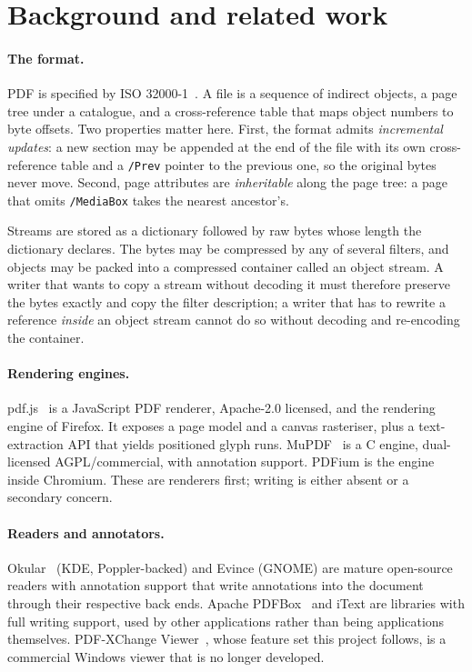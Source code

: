 \section{Background and related work}
\label{sec:related}

\paragraph{The format.} PDF is specified by ISO 32000-1~\cite{iso32000}. A file is a
sequence of indirect objects, a page tree under a catalogue, and a cross-reference table
that maps object numbers to byte offsets. Two properties matter here. First, the format
admits \emph{incremental updates}: a new section may be appended at the end of the file with
its own cross-reference table and a \texttt{/Prev} pointer to the previous one, so the
original bytes never move. Second, page attributes are \emph{inheritable} along the page
tree: a page that omits \texttt{/MediaBox} takes the nearest ancestor's.

Streams are stored as a dictionary followed by raw bytes whose length the dictionary
declares. The bytes may be compressed by any of several filters, and objects may be packed
into a compressed container called an object stream. A writer that wants to copy a stream
without decoding it must therefore preserve the bytes exactly and copy the filter
description; a writer that has to rewrite a reference \emph{inside} an object stream cannot
do so without decoding and re-encoding the container.

\paragraph{Rendering engines.} pdf.js~\cite{pdfjs} is a JavaScript PDF renderer, Apache-2.0
licensed, and the rendering engine of Firefox. It exposes a page model and a canvas
rasteriser, plus a text-extraction API that yields positioned glyph runs. MuPDF~\cite{mupdf}
is a C engine, dual-licensed AGPL/commercial, with annotation support. PDFium is the engine
inside Chromium. These are renderers first; writing is either absent or a secondary concern.

\paragraph{Readers and annotators.} Okular~\cite{okular} (KDE, Poppler-backed) and Evince
(GNOME) are mature open-source readers with annotation support that write annotations into
the document through their respective back ends. Apache PDFBox~\cite{pdfbox} and iText are
libraries with full writing support, used by other applications rather than being
applications themselves. PDF-XChange Viewer~\cite{pdfxchange}, whose feature set this project
follows, is a commercial Windows viewer that is no longer developed.

